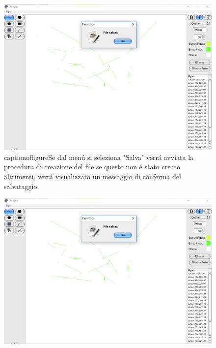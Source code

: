 \documentclass[a4paper,12pt]{article}
\begin{document}
\begin{figure}
  \includegraphics[scale=.5]{Immagini/Debug/test4.png}
  \\captionof{figure}{Se dal menú si seleziona "Salva" verrá avviata la procedura di creazione del file se questo non é stato creato altrimenti, verrá visualizzato un messaggio di conferma del salvataggio}
\end{figure}

\begin{figure}
  \includegraphics[scale=.5]{Immagini/Debug/test4.png}
\end{figure}
\end{document}
